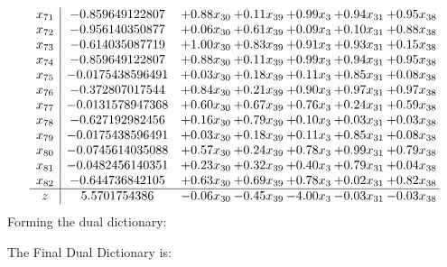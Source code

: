 \documentclass[8pt]{article}
\begin{document}
\[\begin{array}{c| c c@{\hskip 2pt} c@{\hskip 2pt} c@{\hskip 2pt} c@{\hskip 2pt} c@{\hskip 2pt} }
 x_{71}   &  -0.859649122807 & +  0.88 x_{30} & +  0.11 x_{39} & +  0.99 x_{3} & +  0.94 x_{31} & +  0.95 x_{38}\\
 x_{72}   &  -0.956140350877 & +  0.06 x_{30} & +  0.61 x_{39} & +  0.09 x_{3} & +  0.10 x_{31} & +  0.88 x_{38}\\
 x_{73}   &  -0.614035087719 & +  1.00 x_{30} & +  0.83 x_{39} & +  0.91 x_{3} & +  0.93 x_{31} & +  0.15 x_{38}\\
 x_{74}   &  -0.859649122807 & +  0.88 x_{30} & +  0.11 x_{39} & +  0.99 x_{3} & +  0.94 x_{31} & +  0.95 x_{38}\\
 x_{75}   &  -0.0175438596491 & +  0.03 x_{30} & +  0.18 x_{39} & +  0.11 x_{3} & +  0.85 x_{31} & +  0.08 x_{38}\\
 x_{76}   &  -0.372807017544 & +  0.84 x_{30} & +  0.21 x_{39} & +  0.90 x_{3} & +  0.97 x_{31} & +  0.97 x_{38}\\
 x_{77}   &  -0.0131578947368 & +  0.60 x_{30} & +  0.67 x_{39} & +  0.76 x_{3} & +  0.24 x_{31} & +  0.59 x_{38}\\
 x_{78}   &  -0.627192982456 & +  0.16 x_{30} & +  0.79 x_{39} & +  0.10 x_{3} & +  0.03 x_{31} & +  0.03 x_{38}\\
 x_{79}   &  -0.0175438596491 & +  0.03 x_{30} & +  0.18 x_{39} & +  0.11 x_{3} & +  0.85 x_{31} & +  0.08 x_{38}\\
 x_{80}   &  -0.0745614035088 & +  0.57 x_{30} & +  0.24 x_{39} & +  0.78 x_{3} & +  0.99 x_{31} & +  0.79 x_{38}\\
 x_{81}   &  -0.0482456140351 & +  0.23 x_{30} & +  0.32 x_{39} & +  0.40 x_{3} & +  0.79 x_{31} & +  0.04 x_{38}\\
 x_{82}   &  -0.644736842105 & +  0.63 x_{30} & +  0.69 x_{39} & +  0.78 x_{3} & +  0.02 x_{31} & +  0.82 x_{38}\\
\hline
z    &  5.5701754386 & -0.06 x_{30} & -0.45 x_{39} & -4.00 x_{3} & -0.03 x_{31} & -0.03 x_{38}\\
\end{array}\]
Forming the dual dictionary:

The Final Dual Dictionary is: 
\end{document}
